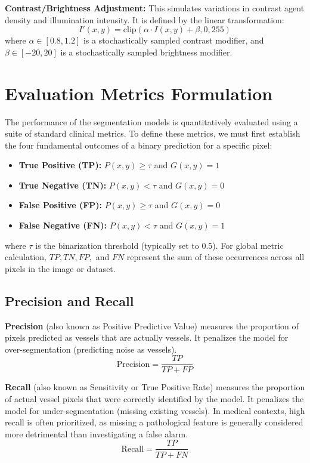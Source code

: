 \textbf{Contrast/Brightness Adjustment:} This simulates variations in contrast agent density and illumination intensity. It is defined by the linear transformation:
\begin{equation}
    I'(x,y) = \text{clip}(\alpha \cdot I(x,y) + \beta, 0, 255)
\end{equation}
where $\alpha \in [0.8, 1.2]$ is a stochastically sampled contrast modifier, and $\beta \in [-20, 20]$ is a stochastically sampled brightness modifier.

\section{Evaluation Metrics Formulation}
The performance of the segmentation models is quantitatively evaluated using a suite of standard clinical metrics. To define these metrics, we must first establish the four fundamental outcomes of a binary prediction for a specific pixel:
\begin{itemize}
    \item \textbf{True Positive (TP):} $P(x,y) \ge \tau$ and $G(x,y) = 1$
    \item \textbf{True Negative (TN):} $P(x,y) < \tau$ and $G(x,y) = 0$
    \item \textbf{False Positive (FP):} $P(x,y) \ge \tau$ and $G(x,y) = 0$
    \item \textbf{False Negative (FN):} $P(x,y) < \tau$ and $G(x,y) = 1$
\end{itemize}
where $\tau$ is the binarization threshold (typically set to 0.5). For global metric calculation, $TP, TN, FP,$ and $FN$ represent the sum of these occurrences across all pixels in the image or dataset.

\subsection{Precision and Recall}
\textbf{Precision} (also known as Positive Predictive Value) measures the proportion of pixels predicted as vessels that are actually vessels. It penalizes the model for over-segmentation (predicting noise as vessels).
\begin{equation}
    \text{Precision} = \frac{TP}{TP + FP}
\end{equation}

\textbf{Recall} (also known as Sensitivity or True Positive Rate) measures the proportion of actual vessel pixels that were correctly identified by the model. It penalizes the model for under-segmentation (missing existing vessels). In medical contexts, high recall is often prioritized, as missing a pathological feature is generally considered more detrimental than investigating a false alarm.
\begin{equation}
    \text{Recall} = \frac{TP}{TP + FN}
\end{equation}

